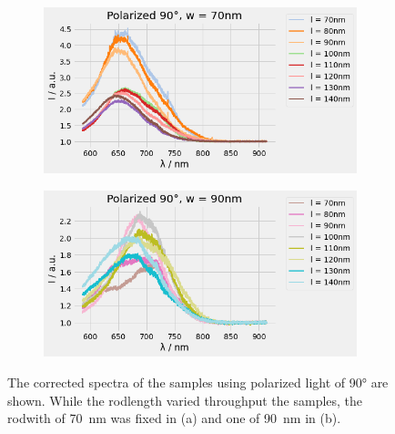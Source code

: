 \begin{figure}
    \centering
    \begin{subfigure}{\textwidth}
        \includegraphics[width=\textwidth]{Bilder/Auswertung/SpektrumPol9070.png}
        \caption{ }
        \label{fig:90-70}
    \end{subfigure}
    \hfill
    \begin{subfigure}{\textwidth}
        \includegraphics[width=\textwidth]{Bilder/Auswertung/SpektrumPol9090.png}
        \caption{ }
        \label{fig:90-90}
    \end{subfigure}
    \caption{The corrected spectra of the samples using polarized light of \ang{90} are shown. While the rodlength varied throughput the samples, the rodwith of \SI{70}{\nano\meter} was fixed in (a) and one of \SI{90}{\nano\meter} in (b).}
    \label{fig:pol90}
\end{figure}

